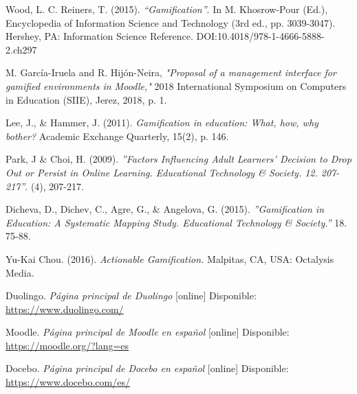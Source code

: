 \begin{thebibliography}{9}
        Wood, L. C. Reiners, T. (2015). {\it ``Gamification''}. In M. Khosrow-Pour (Ed.), Encyclopedia of Information Science and Technology (3rd ed., pp. 3039-3047). Hershey, PA: Information Science Reference. DOI:10.4018/978-1-4666-5888-2.ch297
        
    M. García-Iruela and R. Hijón-Neira, 
    \textit{"Proposal of a management interface for gamified environments in Moodle,"} 2018 International Symposium on Computers in Education (SIIE), Jerez, 2018, p. 1.
        
        Lee, J., \& Hammer, J. (2011). 
        \textit{Gamification in education: What, how, why bother?} 
        Academic Exchange Quarterly, 15(2), p. 146.
    
        Park, J \& Choi, H. (2009). {\it ''Factors Influencing Adult Learners' Decision to Drop Out or Persist in Online Learning. Educational Technology \& Society. 12. 207-217''}. (4), 207-217.

        Dicheva, D., Dichev, C., Agre, G., \& Angelova, G. (2015). {\it''Gamification in Education: A Systematic Mapping Study. Educational Technology \& Society.''} 18. 75-88.
        
        Yu-Kai Chou. (2016). 
        \textit{Actionable Gamification.}
        Malpitas, CA, USA: Octalysis Media.
\begin{comment}
    
    \bibitem{arte1}
        \textit{Moodle Plugin,}
        Febrero 2019, [online] Disponible: 
        \url{https://moodle.org/plugins/?q=gamification}
    
\end{comment}

    Duolingo. \textit{Página principal de Duolingo} [online] Disponible: \url{https://www.duolingo.com/}

    Moodle. \textit{Página principal de Moodle en español} [online] Disponible:
    \url{https://moodle.org/?lang=es}
    
    Docebo. \textit{Página principal de Docebo en español} [online] Disponible:
    \url{https://www.docebo.com/es/}
    

\end{thebibliography}
